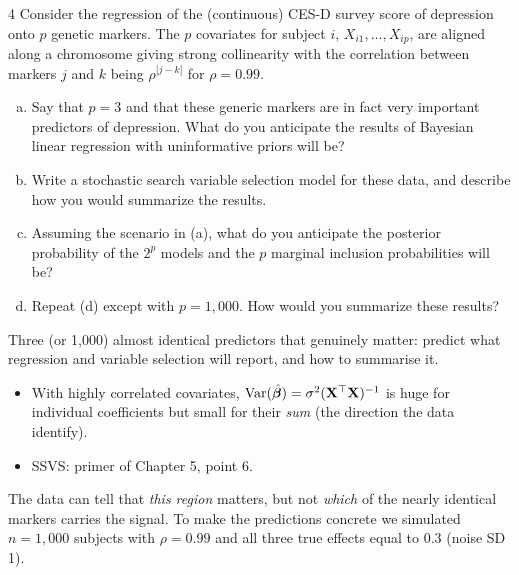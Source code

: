 \documentclass[11pt]{article}
\begin{document}
\begin{problem}{4}
Consider the regression of the (continuous) CES-D survey score of depression onto $p$ genetic markers. The $p$ covariates for subject $i$, $X_{i1},\dots,X_{ip}$, are aligned along a chromosome giving strong collinearity with the correlation between markers $j$ and $k$ being $\rho^{|j-k|}$ for $\rho=0.99$.
\begin{enumerate}[(a)]
\item Say that $p=3$ and that these generic markers are in fact very important predictors of depression. What do you anticipate the results of Bayesian linear regression with uninformative priors will be?
\item Write a stochastic search variable selection model for these data, and describe how you would summarize the results.
\item Assuming the scenario in (a), what do you anticipate the posterior probability of the $2^p$ models and the $p$ marginal inclusion probabilities will be?
\item Repeat (d) except with $p=1{,}000$. How would you summarize these results?
\end{enumerate}
\end{problem}

\begin{restate}
Three (or 1{,}000) almost identical predictors that genuinely matter: predict what regression and variable selection will report, and how to summarise it.
\end{restate}

\begin{recall}
\begin{itemize}
\item With highly correlated covariates, $\mathrm{Var}(\hat{\bm\beta})=\sigma^2(\mathbf X^\top\mathbf X)^{-1}$ is huge for individual coefficients but small for their \emph{sum} (the direction the data identify).
\item SSVS: primer of Chapter 5, point 6.
\end{itemize}
\end{recall}

\begin{keyidea}
The data can tell that \emph{this region} matters, but not \emph{which} of the nearly identical markers carries the signal. To make the predictions concrete we simulated $n=1{,}000$ subjects with $\rho=0.99$ and all three true effects equal to 0.3 (noise SD 1).
\end{keyidea}
\end{document}
